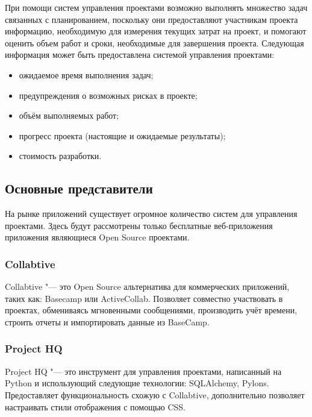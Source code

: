 При помощи систем управления проектами возможно выполнять множество задач
связанных с планированием, поскольку они предоставляют участникам проекта
информацию, необходимую для измерения текущих затрат на проект, и помогают
оценить объем работ и сроки, необходимые для завершения проекта. Следующая
информация может быть предоставлена системой управления проектами:
\begin{itemize}
  \item ожидаемое время выполнения задач;
  \item предупреждения о возможных рисках в проекте;
  \item объём выполняемых работ;
  \item прогресс проекта (настоящие и ожидаемые результаты);
  \item стоимость разработки.
\end{itemize}


\subsection{Основные представители}


На рынке приложений существует огромное количество систем для управления
проектами. Здесь будут рассмотрены только бесплатные веб-приложения
приложения являющиеся Open Source проектами.

\subsubsection{Collabtive}
Collabtive "--- это Open Source альтернатива для коммерческих приложений, таких
как: Basecamp или ActiveCollab. Позволяет совместно участвовать в
проектах, обмениваясь мгновенными сообщениями, производить учёт времени,
строить отчеты и импортировать данные из BaseCamp.

\subsubsection{Project HQ}
Project HQ "--- это инструмент для управления проектами, написанный на Python и
использующий следующие технологии: SQLAlchemy, Pylons. Предоставляет
функциональность схожую с Collabtive, дополнительно позволяет настраивать стили
отображения с помощью CSS.

